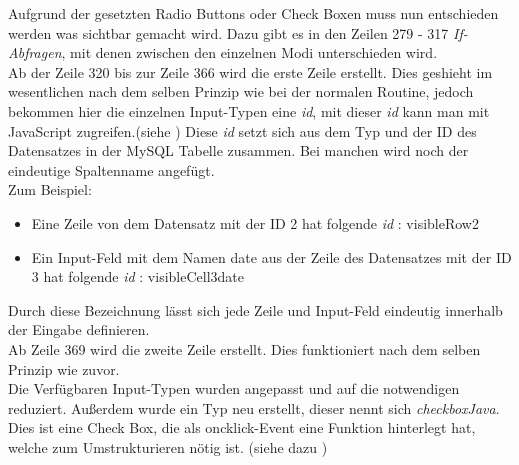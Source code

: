 Aufgrund der gesetzten Radio Buttons oder Check Boxen muss nun entschieden werden was sichtbar gemacht wird. Dazu gibt es in den Zeilen 279 - 317 \textit{If-Abfragen}, mit denen zwischen den einzelnen Modi unterschieden wird.\\  
Ab der Zeile 320 bis zur Zeile 366 wird die erste Zeile erstellt. Dies geshieht im wesentlichen nach dem selben Prinzip wie bei der normalen Routine, jedoch bekommen hier die einzelnen Input-Typen eine \textit{id}, mit dieser \textit{id} kann man mit JavaScript zugreifen.(siehe ) Diese \textit{id} setzt sich aus dem Typ und der ID des Datensatzes in der MySQL Tabelle zusammen. Bei manchen wird noch der eindeutige Spaltenname angefügt.\\
Zum Beispiel:
\begin{itemize}
	\item Eine Zeile von dem Datensatz mit der ID 2 hat folgende \textit{id} : visibleRow2
	\item Ein Input-Feld mit dem Namen date aus der Zeile des Datensatzes mit der ID 3 hat folgende \textit{id} : visibleCell3date
\end{itemize}
Durch diese Bezeichnung lässt sich jede Zeile und Input-Feld eindeutig innerhalb der Eingabe definieren.\\
Ab Zeile 369 wird die zweite Zeile erstellt. Dies funktioniert nach dem selben Prinzip wie zuvor.\\
Die Verfügbaren Input-Typen wurden angepasst und auf die notwendigen reduziert. Außerdem wurde ein Typ neu erstellt, dieser nennt sich \textit{checkboxJava}. Dies ist eine Check Box, die als oncklick-Event eine Funktion hinterlegt hat, welche zum Umstrukturieren nötig ist. (siehe dazu )

